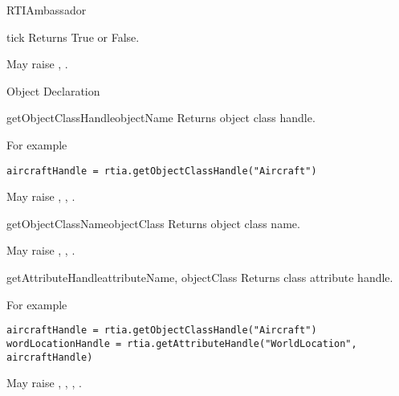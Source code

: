 \begin{classdesc}{RTIAmbassador}{}
\begin{methoddesc}{tick}{}
Returns True or False.

May raise
,
.
\end{methoddesc}

\begin{hlamsc}{Object Declaration}

\nextlevel
{}
\nextlevel
{}
\nextlevel
{}
\nextlevel
{}
\nextlevel
{}
\nextlevel[3]
\nextlevel
{}
\nextlevel
{}
\nextlevel
\end{hlamsc}

\begin{methoddesc}{getObjectClassHandle}{objectName}
Returns object class handle.

For example
\begin{verbatim} 
aircraftHandle = rtia.getObjectClassHandle("Aircraft")
\end{verbatim}

May raise
,
,
.
\end{methoddesc}

\begin{methoddesc}{getObjectClassName}{objectClass}
Returns object class name.

May raise
,
,
.
\end{methoddesc}

\begin{methoddesc}{getAttributeHandle}{attributeName, objectClass}
Returns class attribute handle.

For example
\begin{verbatim} 
aircraftHandle = rtia.getObjectClassHandle("Aircraft")
wordLocationHandle = rtia.getAttributeHandle("WorldLocation", aircraftHandle)
\end{verbatim}

May raise
,
,
,
.
\end{methoddesc}


\end{classdesc}

